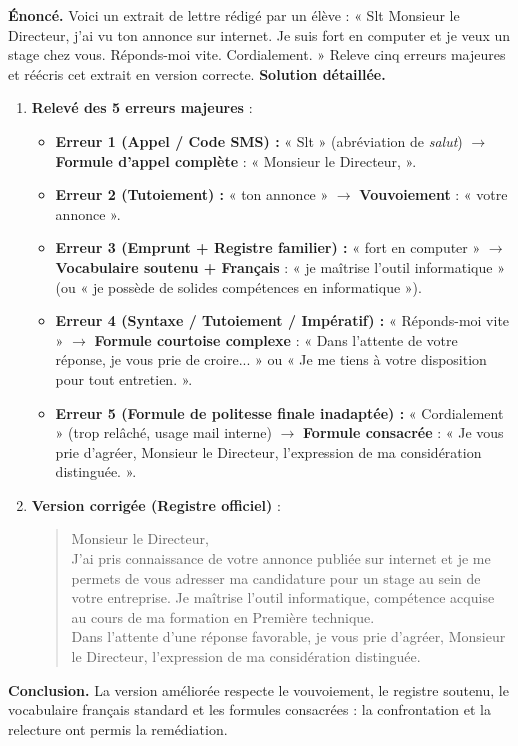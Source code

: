 \documentclass[11pt]{article}
\begin{document}
\begin{exoresolu}
\textbf{Énoncé.} Voici un extrait de lettre rédigé par un élève : « Slt Monsieur le Directeur, j'ai vu ton annonce sur internet. Je suis fort en computer et je veux un stage chez vous. Réponds-moi vite. Cordialement. » Releve cinq erreurs majeures et réécris cet extrait en version correcte.
\tcblower
\textbf{Solution détaillée.}
\begin{enumerate}
\item \textbf{Relevé des 5 erreurs majeures} :
\begin{itemize}
\item \textbf{Erreur 1 (Appel / Code SMS) :} « Slt » (abréviation de \emph{salut}) $\rightarrow$ \textbf{Formule d'appel complète} : « Monsieur le Directeur, ».
\item \textbf{Erreur 2 (Tutoiement) :} « ton annonce » $\rightarrow$ \textbf{Vouvoiement} : « votre annonce ».
\item \textbf{Erreur 3 (Emprunt + Registre familier) :} « fort en computer » $\rightarrow$ \textbf{Vocabulaire soutenu + Français} : « je maîtrise l'outil informatique » (ou « je possède de solides compétences en informatique »).
\item \textbf{Erreur 4 (Syntaxe / Tutoiement / Impératif) :} « Réponds-moi vite » $\rightarrow$ \textbf{Formule courtoise complexe} : « Dans l'attente de votre réponse, je vous prie de croire... » ou « Je me tiens à votre disposition pour tout entretien. ».
\item \textbf{Erreur 5 (Formule de politesse finale inadaptée) :} « Cordialement » (trop relâché, usage mail interne) $\rightarrow$ \textbf{Formule consacrée} : « Je vous prie d'agréer, Monsieur le Directeur, l'expression de ma considération distinguée. ».
\end{itemize}
\item \textbf{Version corrigée (Registre officiel)} :
\begin{quote}
Monsieur le Directeur,\\
J'ai pris connaissance de votre annonce publiée sur internet et je me permets de vous adresser ma candidature pour un stage au sein de votre entreprise. Je maîtrise l'outil informatique, compétence acquise au cours de ma formation en Première technique.\\
Dans l'attente d'une réponse favorable, je vous prie d'agréer, Monsieur le Directeur, l'expression de ma considération distinguée.
\end{quote}
\end{enumerate}
\textbf{Conclusion.} La version améliorée respecte le vouvoiement, le registre soutenu, le vocabulaire français standard et les formules consacrées : la confrontation et la relecture ont permis la remédiation.
\end{exoresolu}
\end{document}
